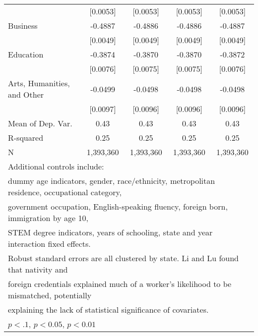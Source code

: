 \begin{table}[htbp]
\begin{tabular}{l*{4}{c}}
                    &    [0.0053]         &    [0.0053]         &    [0.0053]         &    [0.0053]         \\
\addlinespace
Business            &     -0.4887\sym{***}&     -0.4886\sym{***}&     -0.4886\sym{***}&     -0.4887\sym{***}\\
                    &    [0.0049]         &    [0.0049]         &    [0.0049]         &    [0.0049]         \\
\addlinespace
Education           &     -0.3874\sym{***}&     -0.3870\sym{***}&     -0.3870\sym{***}&     -0.3872\sym{***}\\
                    &    [0.0076]         &    [0.0075]         &    [0.0075]         &    [0.0076]         \\
\addlinespace
Arts, Humanities, and Other&     -0.0499\sym{***}&     -0.0498\sym{***}&     -0.0498\sym{***}&     -0.0498\sym{***}\\
                    &    [0.0097]         &    [0.0096]         &    [0.0096]         &    [0.0096]         \\
\midrule
Mean of Dep. Var.   &        0.43         &        0.43         &        0.43         &        0.43         \\
R-squared           &        0.25         &        0.25         &        0.25         &        0.25         \\
N                   &   1,393,360         &   1,393,360         &   1,393,360         &   1,393,360         \\
\bottomrule
\multicolumn{5}{l}{\footnotesize Additional controls include:}\\
\multicolumn{5}{l}{\footnotesize dummy age indicators, gender, race/ethnicity, metropolitan residence, occupational category,}\\
\multicolumn{5}{l}{\footnotesize government occupation, English-speaking fluency, foreign born, immigration by age 10,}\\
\multicolumn{5}{l}{\footnotesize STEM degree indicators, years of schooling, state and year interaction fixed effects.}\\
\multicolumn{5}{l}{\footnotesize Robust standard errors are all clustered by state. Li and Lu found that nativity and}\\
\multicolumn{5}{l}{\footnotesize foreign credentials explained much of a worker's likelihood to be mismatched, potentially}\\
\multicolumn{5}{l}{\footnotesize explaining the lack of statistical significance of covariates.}\\
\multicolumn{5}{l}{\footnotesize \sym{*} \(p<.1\), \sym{**} \(p<0.05\), \sym{***} \(p<0.01\)}\\
\end{tabular}
\end{table}
